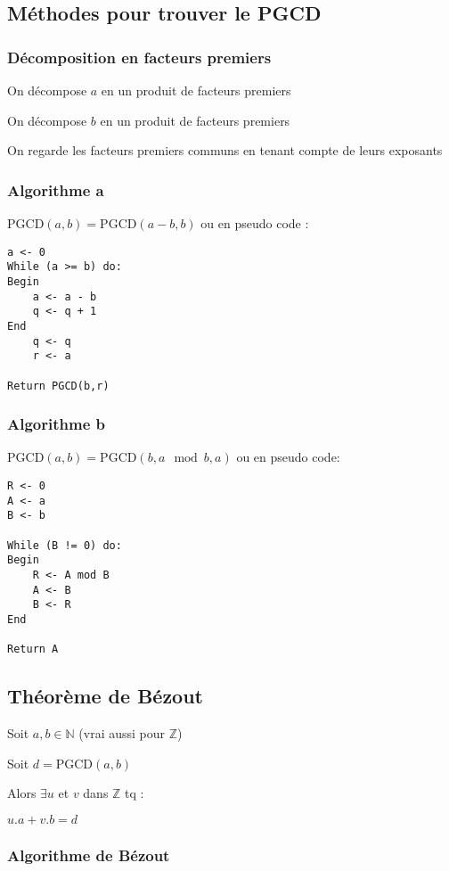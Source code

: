 \documentclass[a4paper,10pt]{article}
\newcommand{\N}{\mathbb{N}}
\newcommand{\Z}{\mathbb{Z}}
\newcommand{\PGCD}{\mbox{PGCD}}
\begin{document}
\subsection{Méthodes pour trouver le PGCD}

\subsubsection{Décomposition en facteurs premiers}

On décompose $a$ en un produit de facteurs premiers

On décompose $b$ en un produit de facteurs premiers

On regarde les facteurs premiers communs en tenant compte de leurs exposants

\subsubsection{Algorithme a}

$\PGCD(a,b) = \PGCD(a - b, b)$ ou en pseudo code :

\begin{verbatim}
a <- 0
While (a >= b) do:
Begin
    a <- a - b
    q <- q + 1
End
    q <- q
    r <- a

Return PGCD(b,r)
\end{verbatim}

\subsubsection{Algorithme b}

$\PGCD(a,b) = \PGCD(b, a \mod b, a)$ ou en pseudo code:

\begin{verbatim}
R <- 0
A <- a
B <- b

While (B != 0) do:
Begin
    R <- A mod B
    A <- B
    B <- R
End

Return A
\end{verbatim}

\subsection{Théorème de Bézout}

Soit $a,b \in \N$ (vrai aussi pour $\Z$)

Soit $d = \PGCD(a,b)$

Alors $\exists u$ et $v$ dans $\Z$ tq :

$u.a+v.b=d$

\subsubsection{Algorithme de Bézout}
\end{document}
